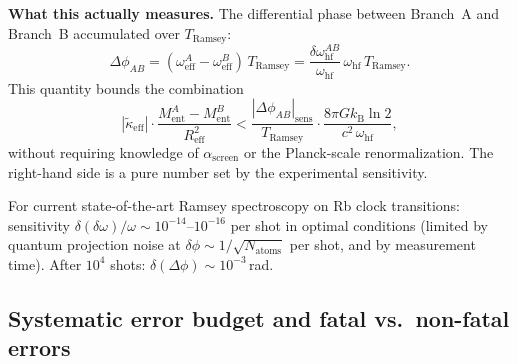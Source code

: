 \documentclass[12pt,letterpaper]{article}
\theoremstyle{plain}
\theoremstyle{definition}
\theoremstyle{remark}
\newcommand{\kB}{k_{\mathrm{B}}}
\newcommand{\kteff}{\tilde{\kappa}_{\mathrm{eff}}}
\newcommand{\Ment}{M_{\mathrm{ent}}}
\newcommand{\asc}{\alpha_{\mathrm{screen}}}
\begin{document}
\textbf{What this actually measures.}
The differential phase between Branch~A and Branch~B accumulated over $T_{\mathrm{Ramsey}}$:
\begin{equation}
  \Delta\phi_{AB}
  = (\omega^A_{\mathrm{eff}} - \omega^B_{\mathrm{eff}})\,T_{\mathrm{Ramsey}}
  = \frac{\delta\omega^{AB}_{\mathrm{hf}}}{\omega_{\mathrm{hf}}}\,\omega_{\mathrm{hf}}\,T_{\mathrm{Ramsey}}.
  \label{eq:phase-diff}
\end{equation}
This quantity bounds the combination
\begin{equation}
  \left|\kteff\right| \cdot \frac{\Ment^A - \Ment^B}{R_{\mathrm{eff}}^2}
  < \frac{|\Delta\phi_{AB}|_{\mathrm{sens}}}{T_{\mathrm{Ramsey}}}
    \cdot \frac{8\pi G\kB\ln 2}{c^2\,\omega_{\mathrm{hf}}},
  \label{eq:bound}
\end{equation}
without requiring knowledge of $\asc$ or the Planck-scale renormalization.
The right-hand side is a pure number set by the experimental sensitivity.

For current state-of-the-art Ramsey spectroscopy on Rb clock transitions:
sensitivity $\delta(\delta\omega)/\omega \sim 10^{-14}$--$10^{-16}$ per shot in optimal
conditions (limited by quantum projection noise at $\delta\phi \sim 1/\sqrt{N_{\mathrm{atoms}}}$
per shot, and by measurement time).  After $10^4$ shots: $\delta(\Delta\phi) \sim 10^{-3}$\,rad.

\subsection{Systematic error budget and fatal vs.\ non-fatal errors}
\end{document}
